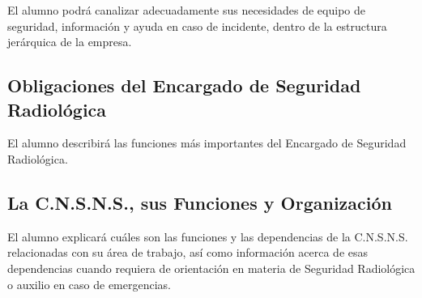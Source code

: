 El alumno podrá canalizar adecuadamente sus necesidades de equipo de seguridad, información y ayuda en caso de incidente, dentro de la estructura jerárquica de la empresa.

\subsection{Obligaciones del Encargado de Seguridad Radiológica}

El alumno describirá las funciones más importantes del Encargado de Seguridad Radiológica.

\subsection{La C.N.S.N.S., sus Funciones y Organización}

El alumno explicará cuáles son las funciones y las dependencias de la C.N.S.N.S. relacionadas con su área de trabajo, así como información acerca de esas dependencias cuando requiera de orientación en materia de Seguridad Radiológica o auxilio en caso de emergencias.